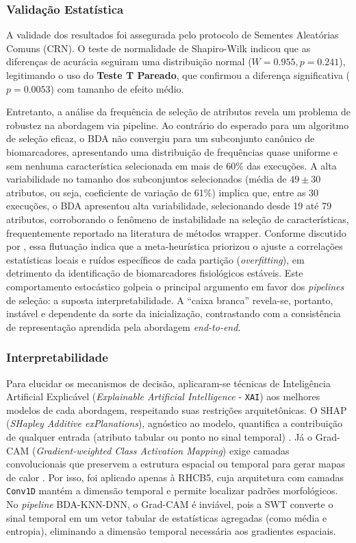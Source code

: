 \documentclass[alpha-refs,brazilian]{CC-EC_TF-TC}
\begin{document}
\subsubsection{Validação Estatística}

A validade dos resultados foi assegurada pelo protocolo de Sementes Aleatórias Comuns (CRN). O teste de normalidade de Shapiro-Wilk indicou que as diferenças de acurácia seguiram uma distribuição normal ($W=0.955, p=0.241$), legitimando o uso do \textbf{Teste T Pareado}, que confirmou a diferença significativa ($p = 0.0053$) com tamanho de efeito médio.

Entretanto, a análise da frequência de seleção de atributos revela um problema de robustez na abordagem via pipeline. Ao contrário do esperado para um algoritmo de seleção eficaz, o BDA não convergiu para um subconjunto canônico de biomarcadores, apresentando uma distribuição de frequências quase uniforme e sem nenhuma característica selecionada em mais de 60\% das execuções. A alta variabilidade no tamanho dos subconjuntos selecionados (média de $49 \pm 30$ atributos, ou seja, coeficiente de variação de 61\%) implica que, entre as 30 execuções, o BDA apresentou alta variabilidade, selecionando desde 19 até 79 atributos, corroborando o fenômeno de instabilidade na seleção de características, frequentemente reportado na literatura de métodos wrapper. Conforme discutido por \cite{Dash1997, Acharya2013EEG, Guyon2003}, essa flutuação indica que a meta-heurística priorizou o ajuste a correlações estatísticas locais e ruídos específicos de cada partição (\textit{overfitting}), em detrimento da identificação de biomarcadores fisiológicos estáveis. Este comportamento estocástico  golpeia o principal argumento em favor dos \textit{pipelines} de seleção: a suposta interpretabilidade. A ``caixa branca'' revela-se, portanto, instável e dependente da sorte da inicialização, contrastando com a consistência de representação aprendida pela abordagem \textit{end-to-end}.

\subsubsection{Interpretabilidade}

Para elucidar os mecanismos de decisão, aplicaram-se técnicas de Inteligência Artificial Explicável (\textit{Explainable Artificial Intelligence} - \texttt{XAI}) aos melhores modelos de cada abordagem, respeitando suas restrições arquitetônicas. O SHAP (\textit{SHapley Additive exPlanations}), agnóstico ao modelo, quantifica a contribuição de qualquer entrada (atributo tabular ou ponto no sinal temporal) \citep{Lundberg2017}. Já o Grad-CAM (\textit{Gradient-weighted Class Activation Mapping}) exige camadas convolucionais que preservem a estrutura espacial ou temporal para gerar mapas de calor \citep{Selvaraju2017}. Por isso, foi aplicado apenas à RHCB5, cuja arquitetura com camadas \texttt{Conv1D} mantém a dimensão temporal e permite localizar padrões morfológicos. No \textit{pipeline} BDA-KNN-DNN, o Grad-CAM é inviável, pois a SWT converte o sinal temporal em um vetor tabular de estatísticas agregadas (como média e entropia), eliminando a dimensão temporal necessária aos gradientes espaciais.
\end{document}
